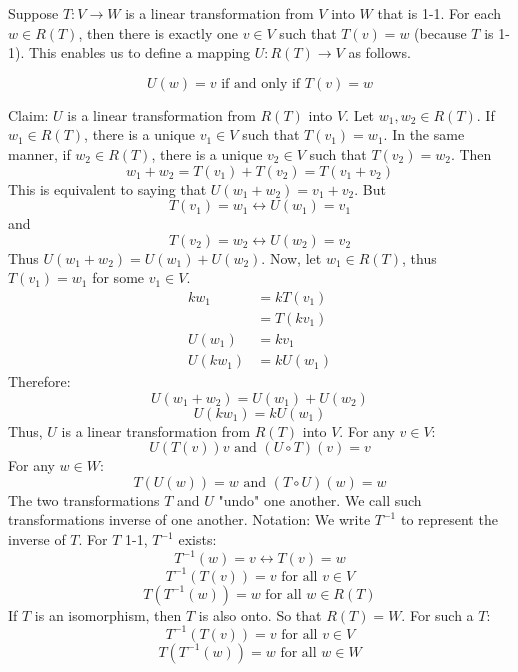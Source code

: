 \documentclass[12pt]{article}
\begin{document}
 Suppose $T: V \to W$ is a linear transformation from $V$ into $W$ that is 1-1. For each $w \in R(T)$, then there is exactly one $v \in V$ such that $T(v) = w$ (because $T$ is 1-1). This enables us to define a mapping $U: R(T) \to V$ as follows. 
 \begin{definition} $$U(w) = v \text{ if and only if } T(v) = w$$ \end{definition} 
 Claim: $U$ is a linear transformation from $R(T)$ into $V$. Let $w_1, w_2 \in R(T)$. If $w_1 \in R(T)$, there is a unique $v_1 \in V$ such that $T(v_1) = w_1$. In the same manner, if $w_2 \in R(T)$, there is a unique $v_2 \in V$ such that $T(v_2) = w_2$. Then $$w_1 + w_2 = T(v_1) + T(v_2) = T(v_1 + v_2) $$ This is equivalent to saying that $U(w_1 + w_2) = v_1 + v_2$. But $$T(v_1) = w_1 \leftrightarrow U(w_1) = v_1 $$ and $$T(v_2) = w_2 \leftrightarrow U(w_2) = v_2 $$ Thus $U(w_1 + w_2) = U(w_1) + U(w_2)$. Now, let $w_1 \in R(T)$, thus $T(v_1) = w_1$ for some $v_1 \in V$. $$\begin{aligned} kw_1 &= kT(v_1) \\ &= T(kv_1) \\ U(w_1) &= kv_1 \\ U(kw_1) &= kU(w_1) \end{aligned} $$ Therefore: $$U(w_1 + w_2) = U(w_1) + U(w_2) $$ $$U(kw_1) = kU(w_1) $$ Thus, $U$ is a linear transformation from $R(T)$ into $V$. \newline 
 For any $v \in V$: $$U(T(v)) v \text{ and } (U \circ T)(v) = v $$ For any $w \in W$: $$T(U(w)) = w \text{ and } (T \circ U)(w) = w $$ 
 The two transformations $T$ and $U$ "undo" one another. We call such transformations inverse of one another. Notation: We write $T^{-1}$ to represent the inverse of $T$. 
\newline For $T$ 1-1, $T^{-1}$ exists: $$T^{-1}(w) = v \leftrightarrow T(v) = w $$ $$T^{-1}(T(v)) = v \text{ for all } v \in V $$ $$T(T^{-1}(w)) = w \text{ for all } w \in R(T) $$ 
If $T$ is an isomorphism, then $T$ is also onto. So that $R(T) = W$. For such a $T$: $$T^{-1}(T(v)) = v \text{ for all } v \in V $$ $$T(T^{-1}(w)) = w \text{ for all } w \in W $$ 
\end{document}
